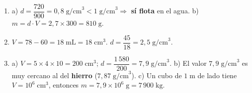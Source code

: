 \documentclass[12pt, letterpaper]{article}
\begin{document}
  \begin{enumerate}[leftmargin=*, label=\textbf{\arabic*.}]
    \item a) $d = \dfrac{720}{900} = 0{,}8\;\text{g/cm}^3 < 1\;\text{g/cm}^3 \Rightarrow$ \textbf{sí flota} en el agua.
          \quad b) $m = d \cdot V = 2{,}7 \times 300 = 810\;\text{g}$.

    \item $V = 78 - 60 = 18\;\text{mL} = 18\;\text{cm}^3$. \quad $d = \dfrac{45}{18} = 2{,}5\;\text{g/cm}^3$.

    \item a) $V = 5 \times 4 \times 10 = 200\;\text{cm}^3$; \quad $d = \dfrac{1\,580}{200} = 7{,}9\;\text{g/cm}^3$.
          \quad b) El valor $7{,}9\;\text{g/cm}^3$ es muy cercano al del \textbf{hierro} ($7{,}87\;\text{g/cm}^3$).
          \quad c) Un cubo de $1\;\text{m}$ de lado tiene $V = 10^6\;\text{cm}^3$, entonces $m = 7{,}9 \times 10^6\;\text{g} = 7\,900\;\text{kg}$.
  \end{enumerate}

\fi
\end{document}
